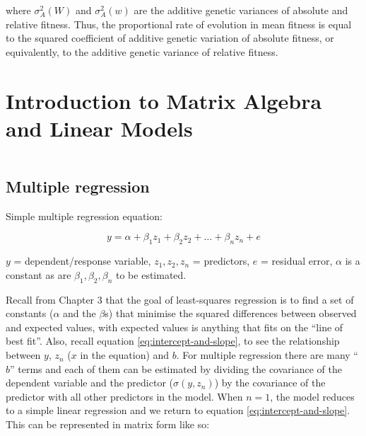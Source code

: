 \documentclass[
]{book}
\begin{document}
where \(\sigma^2_A(W)\) and \(\sigma^2_A(w)\) are the additive genetic variances of absolute and relative fitness. Thus, the proportional rate of evolution in mean fitness is equal to the squared coefficient of additive genetic variation of absolute fitness, or equivalently, to the additive genetic variance of relative fitness.

\hypertarget{introduction-to-matrix-algebra-and-linear-models}{%
\chapter{Introduction to Matrix Algebra and Linear Models}\label{introduction-to-matrix-algebra-and-linear-models}}

\[\newcommand{\mx}[1]{\mathbf{#1}}\]

\hypertarget{multiple-regression}{%
\section{Multiple regression}\label{multiple-regression}}

Simple multiple regression equation:

\begin{equation}
    y = \alpha + \beta_1z_1 + \beta_2z_2 + \dots + \beta_nz_n + e
    \label{eq:simple-multiple-regression}
\end{equation}

\(y\) = dependent/response variable, \(z_1, z_2, z_n\) = predictors, \(e\) = residual error, \(\alpha\) is a constant as are \(\beta_1, \beta_2, \beta_n\) to be estimated.

Recall from Chapter 3 that the goal of least-squares regression is to find a set of constants (\(\alpha\) and the \(\beta\)s) that minimise the squared differences between observed and expected values, with expected values is anything that fits on the ``line of best fit''. Also, recall equation \eqref{eq:intercept-and-slope}, to see the relationship between \(y\), \(z_n\) (\(x\) in the equation) and \(b\). For multiple regression there are many ``\(b\)'' terms and each of them can be estimated by dividing the covariance of the dependent variable and the predictor (\(\sigma(y, z_n)\)) by the covariance of the predictor with all other predictors in the model. When \(n = 1\), the model reduces to a simple linear regression and we return to equation \eqref{eq:intercept-and-slope}. This can be represented in matrix form like so:
\end{document}
